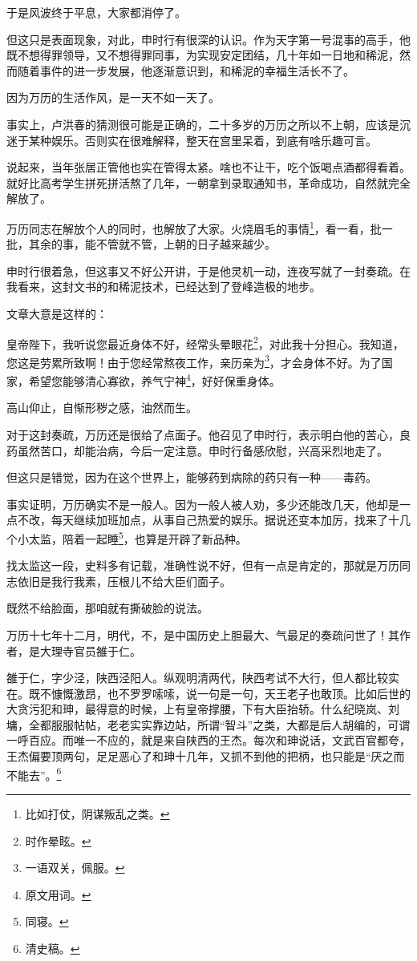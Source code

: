 \begin{multicols}{\theparacolNo}
		于是风波终于平息，大家都消停了。

		但这只是表面现象，对此，申时行有很深的认识。作为天字第一号混事的高手，他既不想得罪领导，又不想得罪同事，为实现安定团结，几十年如一日地和稀泥，然而随着事件的进一步发展，他逐渐意识到，和稀泥的幸福生活长不了。

		因为万历的生活作风，是一天不如一天了。

		事实上，卢洪春的猜测很可能是正确的，二十多岁的万历之所以不上朝，应该是沉迷于某种娱乐。否则实在很难解释，整天在宫里呆着，到底有啥乐趣可言。

		说起来，当年张居正管他也实在管得太紧。啥也不让干，吃个饭喝点酒都得看着。就好比高考学生拼死拼活熬了几年，一朝拿到录取通知书，革命成功，自然就完全解放了。

		万历同志在解放个人的同时，也解放了大家。火烧眉毛的事情\footnote{比如打仗，阴谋叛乱之类。}，看一看，批一批，其余的事，能不管就不管，上朝的日子越来越少。

		申时行很着急，但这事又不好公开讲，于是他灵机一动，连夜写就了一封奏疏。在我看来，这封文书的和稀泥技术，已经达到了登峰造极的地步。

		文章大意是这样的：

		皇帝陛下，我听说您最近身体不好，经常头晕眼花\footnote{时作晕眩。}，对此我十分担心。我知道，您这是劳累所致啊！由于您经常熬夜工作，亲历亲为\footnote{一语双关，佩服。}，才会身体不好。为了国家，希望您能够清心寡欲，养气宁神\footnote{原文用词。}，好好保重身体。

		高山仰止，自惭形秽之感，油然而生。

		对于这封奏疏，万历还是很给了点面子。他召见了申时行，表示明白他的苦心，良药虽然苦口，却能治病，今后一定注意。申时行备感欣慰，兴高采烈地走了。

		但这只是错觉，因为在这个世界上，能够药到病除的药只有一种——毒药。

		事实证明，万历确实不是一般人。因为一般人被人劝，多少还能改几天，他却是一点不改，每天继续加班加点，从事自己热爱的娱乐。据说还变本加厉，找来了十几个小太监，陪着一起睡\footnote{同寝。}，也算是开辟了新品种。

		找太监这一段，史料多有记载，准确性说不好，但有一点是肯定的，那就是万历同志依旧是我行我素，压根儿不给大臣们面子。

		既然不给脸面，那咱就有撕破脸的说法。

		万历十七年十二月，明代，不，是中国历史上胆最大、气最足的奏疏问世了！其作者，是大理寺官员雒于仁。

		雒于仁，字少泾，陕西泾阳人。纵观明清两代，陕西考试不大行，但人都比较实在。既不慷慨激昂，也不罗罗嗦嗦，说一句是一句，天王老子也敢顶。比如后世的大贪污犯和珅，最得意的时候，上有皇帝撑腰，下有大臣抬轿。什么纪晓岚、刘墉，全都服服帖帖，老老实实靠边站，所谓“智斗”之类，大都是后人胡编的，可谓一呼百应。而唯一不应的，就是来自陕西的王杰。每次和珅说话，文武百官都夸，王杰偏要顶两句，足足恶心了和珅十几年，又抓不到他的把柄，也只能是“厌之而不能去”。\footnote{清史稿。}


\end{multicols}
